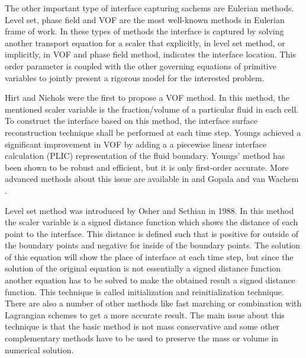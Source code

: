 \documentclass[letterpaper,10pt]{article}
\begin{document}
The other important type of interface capturing sachems are Eulerian methods. Level set, phase field and VOF 
are the most well-known methods in Eulerian frame of work.
In these types of methods the interface is captured by solving another transport equation for a scaler that 
explicitly, in level set method, or implicitly, in VOF and phase field method, indicates the interface location.
This order parameter is coupled with the other governing equations of primitive variables to jointly present 
a rigorous model for the interested problem.\newline



Hirt and Nichols\cite{hirt1981vfv} were the first to propose a VOF method. 
In this method, the mentioned scaler variable is the fraction/volume of a particular fluid in each cell.
To construct the interface based on this method, the interface surface reconstruction technique shall be  
performed at each time step. Youngs\cite{youngs1982tdm} achieved a significant improvement in VOF by adding a 
a piecewise linear interface calculation (PLIC) representation of the fluid boundary.  
Youngs' method has been shown to be robust and efficient, but it is only first-order accurate. 
More advanced methods about this issue are available in \cite{gerlach2006cvf} and Gopala and van Wachem\cite{gopala2008vfm}
\cite {more recent}. 


Level set method was introduced by Osher and Sethian in 1988. In this method the scaler variable is a signed distance function 
which shows the distance of each point to the interface. This distance is defined such that is positive for outside of 
the boundary points and negative for inside of the boundary points. The solution of this equation will show the place of interface 
at each time step, but since the solution of the original equation is not essentially a signed distance function 
another equation has to be solved to make the obtained result a signed distance function. This technique is called 
initialization and reinitialization technique. There are also a number of other methods like fast marching or combination 
with Lagrangian schemes to get a more accurate result. The main issue about this technique is that the basic method is not mass 
conservative and some other complementary methods have to be used to preserve the mass or volume in numerical solution.\newline
\end{document}

